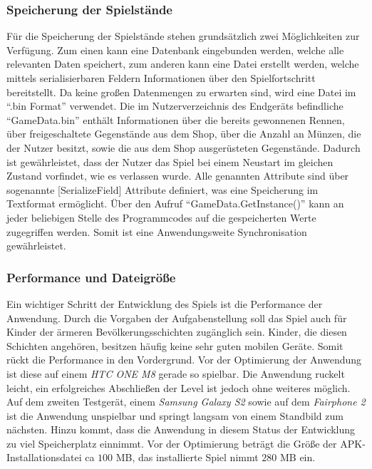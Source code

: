 	\subsubsection{Speicherung der Spielstände\label{speicherung}}
	Für die Speicherung der Spielstände stehen grundsätzlich zwei Möglichkeiten zur Verfügung. Zum einen kann eine Datenbank eingebunden werden, welche alle relevanten Daten speichert, zum anderen kann eine Datei erstellt werden, welche mittels serialisierbaren Feldern Informationen über den Spielfortschritt bereitstellt.
	Da keine großen Datenmengen zu erwarten sind, wird eine Datei im \enquote{.bin Format} verwendet.
	Die im Nutzerverzeichnis des Endgeräts befindliche \enquote{GameData.bin} enthält Informationen über die bereits gewonnenen Rennen, über freigeschaltete Gegenstände aus dem Shop, über die Anzahl an Münzen, die der Nutzer besitzt, sowie die aus dem Shop ausgerüsteten Gegenstände. Dadurch ist gewährleistet, dass der Nutzer das Spiel bei einem Neustart im gleichen Zustand vorfindet, wie es verlassen wurde.
	Alle genannten Attribute sind über sogenannte [SerializeField] Attribute definiert, was eine Speicherung im Textformat ermöglicht. Über den Aufruf \enquote{GameData.GetInstance()} kann an jeder beliebigen Stelle des Programmcodes auf die gespeicherten Werte zugegriffen werden. Somit ist eine Anwendungsweite Synchronisation gewährleistet.

	\subsubsection{Performance und Dateigröße}
	Ein wichtiger Schritt der Entwicklung des Spiels ist die Performance der Anwendung. Durch die Vorgaben der Aufgabenstellung soll das Spiel auch für Kinder der ärmeren Bevölkerungsschichten zugänglich sein. Kinder, die diesen Schichten angehören, besitzen häufig keine sehr guten mobilen Geräte. Somit rückt die Performance in den Vordergrund.
	Vor der Optimierung der Anwendung ist diese auf einem \emph{HTC ONE M8} gerade so spielbar. Die Anwendung ruckelt leicht, ein erfolgreiches Abschließen der Level ist jedoch ohne weiteres möglich. Auf dem zweiten Testgerät, einem \emph{Samsung Galaxy S2} sowie auf dem \emph{Fairphone 2} ist die Anwendung unspielbar und springt langsam von einem Standbild zum nächsten.
	Hinzu kommt, dass die Anwendung in diesem Status der Entwicklung zu viel Speicherplatz einnimmt. Vor der Optimierung beträgt die Größe der APK-Installationsdatei ca $100$ MB, das installierte Spiel nimmt $280$ MB ein.

